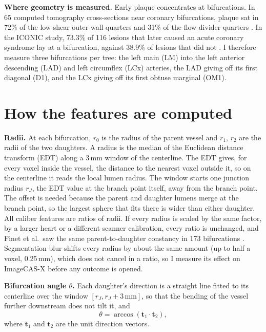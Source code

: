 \documentclass[11pt,a4paper]{article}
\begin{document}
\textbf{Where geometry is measured.} Early plaque concentrates at bifurcations.
In 65 computed tomography cross-sections near coronary bifurcations, plaque sat in 72\% of the low-shear outer-wall quarters and 31\% of the flow-divider quarters \cite{vandergiessen2009bifurcation}.
In the ICONIC study, 73.3\% of 116 lesions that later caused an acute coronary syndrome lay at a bifurcation, against 38.9\% of lesions that did not \cite{han2022plaque}.
I therefore measure three bifurcations per tree: the left main (LM) into the left anterior descending (LAD) and left circumflex (LCx) arteries, the LAD giving off its first diagonal (D1), and the LCx giving off its first obtuse marginal (OM1).

\section{How the features are computed}

\textbf{Radii.} At each bifurcation, $r_0$ is the radius of the parent vessel and $r_1$, $r_2$ are the radii of the two daughters.
A radius is the median of the Euclidean distance transform (EDT) along a 3\,mm window of the centerline.
The EDT gives, for every voxel inside the vessel, the distance to the nearest voxel outside it, so on the centerline it reads the local lumen radius.
The window starts one junction radius $r_J$, the EDT value at the branch point itself, away from the branch point.
The offset is needed because the parent and daughter lumens merge at the branch point, so the largest sphere that fits there is wider than either daughter.
All caliber features are ratios of radii.
If every radius is scaled by the same factor, by a larger heart or a different scanner calibration, every ratio is unchanged, and Finet et al.\ saw the same parent-to-daughter constancy in 173 bifurcations \cite{finet2008fractal}.
Segmentation blur shifts every radius by about the same amount (up to half a voxel, 0.25\,mm), which does not cancel in a ratio, so I measure its effect on ImageCAS-X before any outcome is opened.

\textbf{Bifurcation angle $\theta$.} Each daughter's direction is a straight line fitted to its centerline over the window $[r_J, r_J + 3\,\mathrm{mm}]$, so that the bending of the vessel further downstream does not tilt it, and
\begin{equation}
  \theta = \arccos\left(\mathbf{t}_1\cdot\mathbf{t}_2\right),
  \label{eq:angle}
\end{equation}
where $\mathbf{t}_1$ and $\mathbf{t}_2$ are the unit direction vectors.
\end{document}
